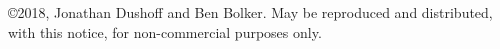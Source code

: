 \copyright 2018, Jonathan Dushoff and Ben Bolker.  May be reproduced and distributed, with this notice, for non-commercial purposes only.
